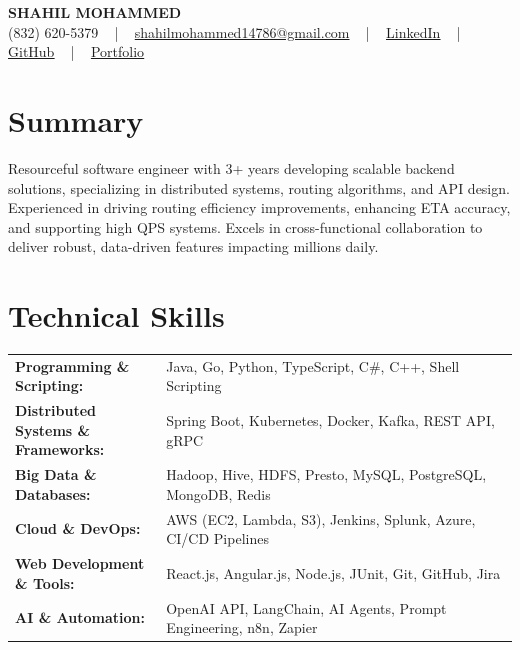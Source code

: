\documentclass[letterpaper,11pt]{article}
\begin{document}
\begin{center}
    {\fontsize{14pt}{12pt}\selectfont \textbf{\MakeUppercase{Shahil Mohammed}}}\\ \vspace{2pt}
    \fontsize{10pt}{12pt}\selectfont (832) 620-5379 ~ | ~ \href{mailto:shahilmohammed14786@gmail.com}{shahilmohammed14786@gmail.com} ~ | ~  
    \href{https://www.linkedin.com/in/shahil-mohammed-9652931a1/}{\color{blue}\underline{LinkedIn}}  ~ | ~ 
    \href{https://github.com/freakbeast14}{\color{blue}\underline{GitHub}} ~ | ~ 
    \href{https://shahil-mohammed.netlify.app/}{\color{blue}\underline{Portfolio}}
    \vspace{-8pt}
\end{center}

\section{Summary}
\fontsize{9pt}{10pt}\selectfont
Resourceful software engineer with 3+ years developing scalable backend solutions, specializing in distributed systems, routing algorithms, and API design. Experienced in driving routing efficiency improvements, enhancing ETA accuracy, and supporting high QPS systems. Excels in cross-functional collaboration to deliver robust, data-driven features impacting millions daily.
 \vspace{-5pt}
 
\section{Technical Skills}
        \vspace{-14pt}
        \begin{table}[h]
            \fontsize{9pt}{10pt}\selectfont
            \begin{tabular}{p{0.3\linewidth} p{0.7\linewidth}}
                \textbf{Programming \& Scripting:} & Java, Go, Python, TypeScript, C\#, C++, Shell Scripting \\
                \textbf{Distributed Systems \& Frameworks:} & Spring Boot, Kubernetes, Docker, Kafka, REST API, gRPC \\
                \textbf{Big Data \& Databases:} & Hadoop, Hive, HDFS, Presto, MySQL, PostgreSQL, MongoDB, Redis \\
                \textbf{Cloud \& DevOps:} & AWS (EC2, Lambda, S3), Jenkins, Splunk, Azure, CI/CD Pipelines \\
                \textbf{Web Development \& Tools:} & React.js, Angular.js, Node.js, JUnit, Git, GitHub, Jira \\
                \textbf{AI \& Automation:} & OpenAI API, LangChain, AI Agents, Prompt Engineering, n8n, Zapier \\
            \end{tabular}
        \end{table}
 \vspace{-15pt}
 
\end{document}

